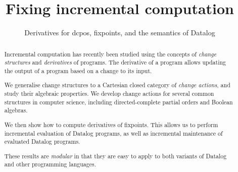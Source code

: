 
%


\usepackage[utf8]{inputenc}
\usepackage{amsmath}
\usepackage{amssymb}
\usepackage{amsthm}
\usepackage{mathtools}
\usepackage{stmaryrd}
\usepackage{thmtools}
\usepackage{todonotes}
\usepackage{etoolbox}
\usepackage{appendix}

\usepackage[
  safeinputenc,
  natbib=true
]{biblatex}
\usepackage{cleveref}
\usepackage{hyperref}

\newcommand{\todoall}[1]{\todo[inline,color=black!30,author=All]{#1}}
\newcommand{\todompj}[1]{\todo[inline,color=yellow!40,author=Michael]{#1}}
\newcommand{\todomario}[1]{\todo[inline,color=blue!40,author=Mario]{#1}}



\newif\ifproofs





%


\begin{abstract}
  Incremental computation has recently been studied using the concepts of \emph{change
  structures} and \emph{derivatives} of programs. The derivative of a program allows updating the output
  of a program based on a change to its input.

  We generalise change structures to a Cartesian closed category of \emph{change actions},
  and study their algebraic properties. We develop change actions for several common structures
  in computer science, including directed-complete partial orders and Boolean algebras.

  We then show how to compute derivatives of fixpoints. This allows us to
  perform incremental evaluation of Datalog programs, as well as incremental
  maintenance of evaluated Datalog programs.

  These results are \emph{modular} in that they are easy to apply to both
  variants of Datalog and other programming languages.
\end{abstract}

\title{Fixing incremental computation}
\subtitle{Derivatives for dcpos, fixpoints, and the semantics of Datalog}

\maketitle

